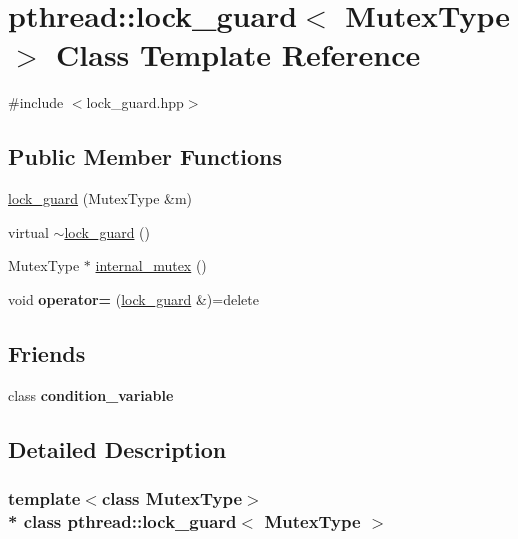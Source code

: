 \hypertarget{classpthread_1_1lock__guard}{}\section{pthread\+:\+:lock\+\_\+guard$<$ Mutex\+Type $>$ Class Template Reference}
\label{classpthread_1_1lock__guard}


{\ttfamily \#include $<$lock\+\_\+guard.\+hpp$>$}

\subsection*{Public Member Functions}
\begin{DoxyCompactItemize}
\item 
\hyperlink{classpthread_1_1lock__guard_a5298f98a23bc7d7fe4fc9636f989ad65}{lock\+\_\+guard} (Mutex\+Type \&m)
\item 
virtual \hyperlink{classpthread_1_1lock__guard_a939eb7ef1b1b53d9603734fc6b120f76}{$\sim$lock\+\_\+guard} ()
\item 
Mutex\+Type $\ast$ \hyperlink{classpthread_1_1lock__guard_a0aeeee216e7b322845678cf59990351b}{internal\+\_\+mutex} ()
\item 
void {\bfseries operator=} (\hyperlink{classpthread_1_1lock__guard}{lock\+\_\+guard} \&)=delete\hypertarget{classpthread_1_1lock__guard_a1f9ab705f7ffe9eb8739ff3cf34cf7f2}{}\label{classpthread_1_1lock__guard_a1f9ab705f7ffe9eb8739ff3cf34cf7f2}

\end{DoxyCompactItemize}
\subsection*{Friends}
\begin{DoxyCompactItemize}
\item 
class {\bfseries condition\+\_\+variable}\hypertarget{classpthread_1_1lock__guard_a89c9b6aa2256fa5efd92a333d96381d4}{}\label{classpthread_1_1lock__guard_a89c9b6aa2256fa5efd92a333d96381d4}

\end{DoxyCompactItemize}


\subsection{Detailed Description}
\subsubsection*{template$<$class Mutex\+Type$>$\\*
class pthread\+::lock\+\_\+guard$<$ Mutex\+Type $>$}

